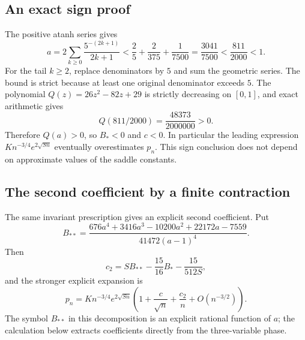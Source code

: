\documentclass[11pt,letterpaper]{article}
\numberwithin{equation}{section}
\theoremstyle{definition}\newtheorem{definition}[theorem]{Definition}
\theoremstyle{remark}\newtheorem{remark}[theorem]{Remark}
\begin{document}
\subsection{An exact sign proof}
The positive atanh series gives
\begin{equation}\label{mss:eq:logbound}
a=2\sum_{k\ge0}\frac{5^{-(2k+1)}}{2k+1}
<\frac25+\frac2{375}+\frac1{7500}
=\frac{3041}{7500}<\frac{811}{2000}<1.
\end{equation}
For the tail $k\ge2$, replace denominators by $5$ and sum the geometric series. The bound is strict because at least one original denominator exceeds $5$. The polynomial $Q(z)=26z^2-82z+29$ is strictly decreasing on $[0,1]$, and exact arithmetic gives
\begin{equation}\label{mss:eq:Qsign}
Q(811/2000)=\frac{48373}{2000000}>0.
\end{equation}
Therefore $Q(a)>0$, so $B_*<0$ and $c<0$. In particular the leading expression $K n^{-3/4}e^{2\sqrt{Sn}}$ eventually overestimates $p_n$. This sign conclusion does not depend on approximate values of the saddle constants.

\subsection{The second coefficient by a finite contraction}\label{mss:sec:second}
The same invariant prescription gives an explicit second coefficient. Put
\begin{equation}\label{mss:eq:B2}
B_{**}=\frac{676a^4+3416a^3-10200a^2+22172a-7559}
{41472(a-1)^4}.
\end{equation}
Then
\begin{equation}\label{mss:eq:secondclosed}
c_2=S B_{**}-\frac{15}{16}B_*-\frac{15}{512S},
\end{equation}
and the stronger explicit expansion is
\begin{equation}\label{mss:eq:secondexpansion}
p_n=K n^{-3/4}e^{2\sqrt{Sn}}
\left(1+\frac c{\sqrt n}+\frac{c_2}{n}+O(n^{-3/2})\right).
\end{equation}
The symbol $B_{**}$ in this decomposition is an explicit rational function of $a$; the calculation below extracts coefficients directly from the three-variable phase.
\end{document}
